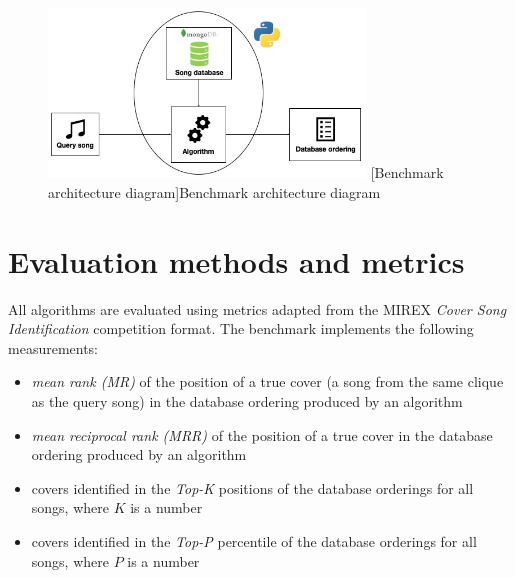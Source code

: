 \begin{figure}[H]
    \centering
    \includegraphics[width=0.75\textwidth]{EvaluationTask/benchmark_architecture.jpg}
    [Benchmark architecture diagram]{Benchmark architecture diagram}
    \label{fig:bencharch}
\end{figure}

\section{Evaluation methods and metrics} 
\label{sec:evalmethods}
All algorithms are evaluated using metrics adapted from the MIREX \textit{Cover
Song Identification} competition format. The benchmark implements the following
measurements:
\begin{itemize}
    \item \textit{mean rank (MR)} of the position of a true cover (a song from
    the same clique as the query song) in the database ordering produced by an
    algorithm
    \item \textit{mean reciprocal rank (MRR)} of the position of a true cover in
   the database ordering produced by an algorithm
   \item covers identified in the \textit{Top-K} positions of the database
   orderings for all songs, where $K$ is a number 
   \item covers identified in the \textit{Top-P} percentile of the database
   orderings for all songs, where $P$ is a number 
\end{itemize}

